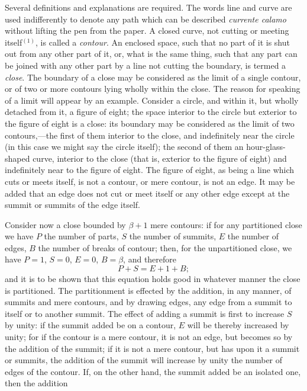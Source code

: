 \documentclass[11pt,a4paper]{article}
\theoremstyle{plain}
\begin{document}
\newpage
Several definitions and explanations are required. The words line and curve are used indifferently to denote any path which can be described \textit{currente calamo} without lifting the pen from the paper. A closed curve, not cutting or meeting itself$^{(1)}$, is called a \textit{contour}. An enclosed space, such that no part of it is shut out from any other part of it, or, what is the same thing, such that any part can be joined with any other part by a line not cutting the boundary, is termed a \textit{close}. The boundary of a close may be considered as the limit of a single contour, or of two or more contours lying wholly within the close. The reason for speaking of a limit will appear by an example. Consider a circle, and within it, but wholly detached from it, a figure of eight; the space interior to the circle but exterior to the figure of eight is a close: its boundary may be considered as the limit of two contours,---the first of them interior to the close, and indefinitely near the circle (in this case we might say the circle itself); the second of them an hour-glass-shaped curve, interior to the close (that is, exterior to the figure of eight) and indefinitely near to the figure of eight. The figure of eight, as being a line which cuts or meets itself, is not a contour, or mere contour, is not an edge. It may be added that an edge does not cut or meet itself or any other edge except at the summit or summits of the edge itself.

Consider now a close bounded by $\beta + 1$ mere contours: if for any partitioned close we have $P$ the number of parts, $S$ the number of summits, $E$ the number of edges, $B$ the number of breaks of contour; then, for the unpartitioned close, we have $P = 1$, $S = 0$, $E = 0$, $B = \beta$, and therefore
\[
P + S = E + 1 + B;
\]
and it is to be shown that this equation holds good in whatever manner the close is partitioned. The partitionment is effected by the addition, in any manner, of summits and mere contours, and by drawing edges, any edge from a summit to itself or to another summit. The effect of adding a summit is first to increase $S$ by unity: if the summit added be on a contour, $E$ will be thereby increased by unity; for if the contour is a mere contour, it is not an edge, but becomes so by the addition of the summit; if it is not a mere contour, but has upon it a summit or summits, the addition of the summit will increase by unity the number of edges of the contour. If, on the other hand, the summit added be an isolated one, then the addition
\end{document}
